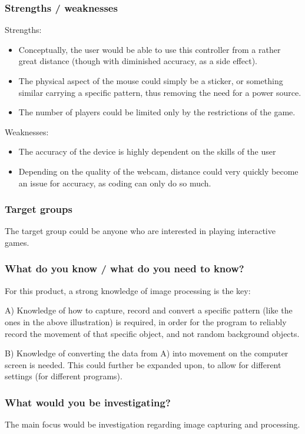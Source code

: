 \subsubsection*{Strengths / weaknesses}
Strengths:
\begin{itemize}
\item Conceptually, the user would be able to use this controller from a rather great distance (though with diminished accuracy, as a side effect).
\item The physical aspect of the mouse could simply be a sticker, or something similar carrying a 	specific pattern, thus removing the need for a power source.
\item The number of players could be limited only by the restrictions of the game.
\end{itemize}
Weaknesses:
\begin{itemize}
\item The accuracy of the device is highly dependent on the skills of the user
\item Depending on the quality of the webcam, distance could very quickly become an issue for 	accuracy, as coding can only do so much.
\end{itemize}

\subsubsection*{Target groups}
The target group could be anyone who are interested in playing interactive games. 

\subsubsection*{What do you know / what do you need to know?}
For this product, a strong knowledge of image processing is the key:
\bigskip

A) Knowledge of how to capture, record and convert a specific pattern (like the ones in the above illustration) is required, in order for the program to reliably record the movement of that specific object, and not random background objects.
\bigskip

B) Knowledge of converting the data from A) into movement on the computer screen is needed. This could further be expanded upon, to allow for different settings (for different programs).

\subsubsection*{What would you be investigating?}
The main focus would be investigation regarding image capturing and processing.

